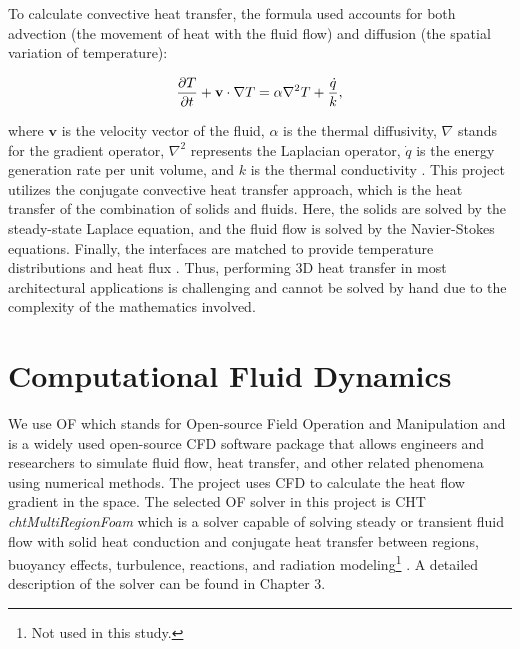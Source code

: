 To calculate convective heat transfer, the formula used accounts for both advection (the movement of heat with the fluid flow) and diffusion (the spatial variation of temperature): 

\begin{equation}
    \frac{\partial T}{\partial t} + \vb v \cdot \nabla T = \alpha \nabla^2 T + \frac{\dot{q}}{k},
\end{equation}

where $\mathbf{v}$ is the velocity vector of the fluid, $\alpha$ is the thermal diffusivity, $\nabla$ stands for the gradient operator, $\nabla^2$ represents the Laplacian operator, $\dot{q}$ is the energy generation rate per unit volume, and $k$ is the thermal conductivity \cite{bergman2011fundamentals}. This project utilizes the conjugate convective heat transfer approach, which is the heat transfer of the combination of solids and fluids. Here, the solids are solved by the steady-state Laplace equation, and the fluid flow is solved by the Navier-Stokes equations. Finally, the interfaces are matched to provide temperature distributions and heat flux \cite{Zhao2007}. Thus, performing 3D heat transfer in most architectural applications is challenging and cannot be solved by hand due to the complexity of the mathematics involved.



\section{Computational Fluid Dynamics}
We use \gls{OF} which stands for Open-source Field Operation and Manipulation and is a widely used open-source \gls{CFD} software package that allows engineers and researchers to simulate fluid flow, heat transfer, and other related phenomena using numerical methods. The project uses \gls{CFD} to calculate the heat flow gradient in the space. The selected \gls{OF} solver in this project is \gls{CHT} \textit{chtMultiRegionFoam} which is a solver capable of solving steady or transient fluid flow with solid heat conduction and conjugate heat transfer between regions, buoyancy effects, turbulence, reactions, and radiation modeling\footnote{Not used in this study.} \cite{cht}. A detailed description of the solver can be found in Chapter 3.


